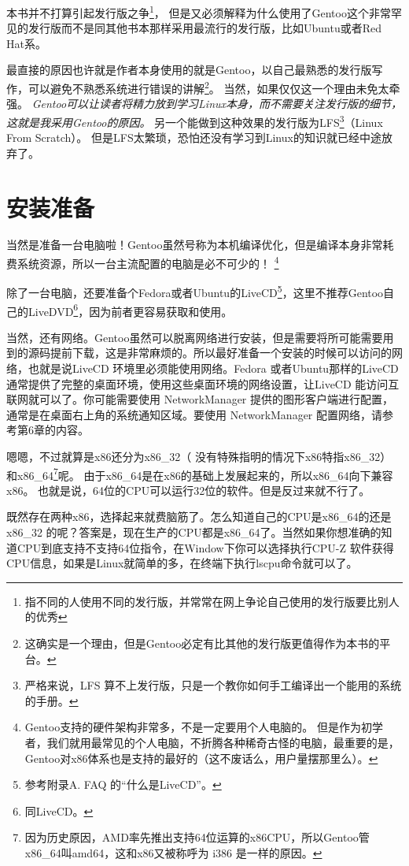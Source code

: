 \documentclass[amstex,twoside]{ctexbook}
\begin{document}
本书并不打算引起发行版之争\footnote{指不同的人使用不同的发行版，并常常在网上争论自己使用的发行版要比别人的优秀}，
但是又必须解释为什么使用了Gentoo这个非常罕见的发行版而不是同其他书本那样采用最流行的发行版，比如Ubuntu或者Red Hat系。

最直接的原因也许就是作者本身使用的就是Gentoo，以自己最熟悉的发行版写作，可以避免不熟悉系统进行错误的讲解\footnote{这确实是一个理由，但是Gentoo必定有比其他的发行版更值得作为本书的平台。}。
当然，如果仅仅这一个理由未免太牵强。
{ \it Gentoo可以让读者将精力放到学习Linux本身，而不需要关注发行版的细节，这就是我采用Gentoo的原因。}
另一个能做到这种效果的发行版为LFS\footnote{严格来说，LFS 算不上发行版，只是一个教你如何手工编译出一个能用的系统的手册。}（Linux From Scratch）。
但是LFS太繁琐，恐怕还没有学习到Linux的知识就已经中途放弃了。


\section{安装准备}

当然是准备一台电脑啦！Gentoo虽然号称为本机编译优化，但是编译本身非常耗费系统资源，所以一台主流配置的电脑是必不可少的！
\footnote{Gentoo支持的硬件架构非常多，不是一定要用个人电脑的。
但是作为初学者，我们就用最常见的个人电脑，不折腾各种稀奇古怪的电脑，最重要的是，Gentoo对x86体系也是支持的最好的（这不废话么，用户量摆那里么）。}


除了一台电脑，还要准备个Fedora或者Ubuntu的LiveCD\footnote{参考附录A. FAQ 的“什么是LiveCD”。
}，这里不推荐Gentoo自己的LiveDVD\footnote{同LiveCD。}，因为前者更容易获取和使用。

当然，还有网络。Gentoo虽然可以脱离网络进行安装，但是需要将所可能需要用到的源码提前下载，这是非常麻烦的。所以最好准备一个安装的时候可以访问的网络，也就是说LiveCD 环境里必须能使用网络。Fedora 或者Ubuntu那样的LiveCD 通常提供了完整的桌面环境，使用这些桌面环境的网络设置，让LiveCD 能访问互联网就可以了。你可能需要使用 NetworkManager 提供的图形客户端进行配置，通常是在桌面右上角的系统通知区域。要使用 NetworkManager 配置网络，请参考第6章的内容。

嗯嗯，不过就算是x86还分为x86\_32（ 没有特殊指明的情况下x86特指x86\_32） 和x86\_64\footnote{因为历史原因，AMD率先推出支持64位运算的x86CPU，所以Gentoo管x86\_64叫amd64，这和x86又被称呼为 i386 是一样的原因。}呢。
由于x86\_64是在x86的基础上发展起来的，所以x86\_64向下兼容x86。 也就是说，64位的CPU可以运行32位的软件。但是反过来就不行了。

既然存在两种x86，选择起来就费脑筋了。怎么知道自己的CPU是x86\_64的还是x86\_32 的呢？答案是，现在生产的CPU都是x86\_64了。当然如果你想准确的知道CPU到底支持不支持64位指令，在Window下你可以选择执行CPU-Z 软件获得CPU信息，如果是Linux就简单的多，在终端下执行lscpu命令就可以了。
\end{document}
